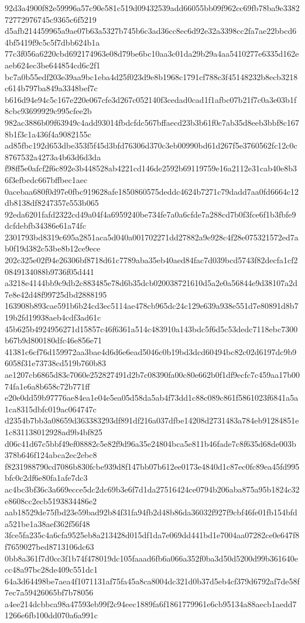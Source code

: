 {92d3a4900f82e59996a57c90e581c519d09432539add66055bb09f962cc69fb78ba9e338272772976745c9365c6f5219
d5afb214459965a9ae07b63a5327b745b6c3ad36cc8ec6d92e32a3398cc2fa7ae22bbcd64bf5419f9c5c5f7dbb624b1a
77c3f056a6220cbd692174963e08d79be6bc10aa3c01da29b29a4aa5410277e6335d162eaeb624ec3be644854cd6c2f1
bc7a0b55edf203e39aa9bc1eba4d25f023d9e8b1968c1791cf788c3f45148232b8ecb3218c614b797ba849a3348bef7c
b616d94e94c5c167e220e067cfe3d267c052140f3cedad0cad1f1afbc07b21f7c0a3e03b1f8cbc93699929c995cfee2b
982ac3886b09f63949c4add93014fbdcfdc567bffaecd23b3b61f0c7ab35d8eeb3bbf8c1678b1f3c1a436f4a9082155c
ad85fbc192d653dbe353f5f45d3bfd76306d370c3eb00990bd61d267f5e3760562fc12c0c8767532a4273a4b63d6d3da
f98ff5e0afcf2f6c892e3b448528ab4221cd146de2592b69119759e16a2112e31cab40e8b36f3efbedc667bffbec1aec
0acebaa680f0d97e0fbc919628afe1850860575deddc4624b7271c79dadd7aa0fd6664c12db8138df8247357e553b065
92eda6201fafd2322cd49a04f4a6959240be734fe7a0a6cfde7a288cd7b0f3fce6f1b3fbfe9dcfdebfb34386e61a74fc
2301793bd8319c695a2851aca5d040a001702271dd27882a9e928c4f28e075321572ed7ab0f19d382c53be8b12ce9ece
202c325e02f94e26306bf8718d61c7789aba35eb40aed84fac7d039bcd5743f82decfa1cf20849134088b9736f05d441
a3218e4144bb9c9db2c883485e78d6b35dcb020038721610d5a2e0a56844e9d38107a2d7e8e42d48f99725dbd2888195
163908b893cae591b6b24cd3ec5114ae478cb965dc24c129e639a938e551d7e80891d8b719b2fd19938aeb4cdf3ad61c
45b625b4924956271d15857c46f6361a514c483910a143bdc5f6d5c53dedc7118ebc7300b67b9d800180dfc46e856e71
41381c6cf76d159972aa3bae4d6d6e6ead5046c0b19bd3dcd60494bc82c02d6197dc9b96058f31e73738cd519b760b83
ae1207cb6865d83c7060e252827491d2b7c08390fa00c80e662b0f1df9ecfc7c459aa17b0074fa1e6a8b658c72b771ff
e20e0dd59b97776ae84ea1e04e5ea05d58da5ab4f73dd1c88c089c861f5861023f6841a5a1ca8315dbfc019ac064747c
d2354b7bb3a08659d363383293df891df216a037dfbe14208d2731483a784eb91284851e1c831138012928ad9b4bf825
d06c41d67c5bbf49ef08882c5e82f9d96a35e24804bca5e811b46fade7c8f635d68de003b378b646f124abca2ec2ebc8
f8231988790cd7086b830fcbe939d8f147bb07b612ee0173e4840d1c87ec0fc89ea45fd995bfc0c2df6e80fa1afe7dc3
ac4bc3bf36c3a669ecce5dc2dc69b3e6f7d1da27516424ce0794b206aba875a95b1824c32e8608cc2ecb5193834486e2
aab18529de75fbd23e59bad92b84f31fa94fb2d48b86da36032f927f9cbf46fe01fb154bfda521be1a38aef362f56f48
3fce5fa235c4a6cfa9525eb8a213428d015df1da7e069dd441bd1e7004aa07282ce0e647f8f7659027bed8713106dc63
0bb8a361f7d0cc3f1b74f478019dc105faaad6fb6a066a352f0ba3d50d5200d99b361640ecc48a97bc28de409c551dc1
64a3d64498be7aea4f1071131af75fa45a8ca8004dc321d0b37d5eb4cf379d6792af7de58f7ec7a59426065bf7b78056
a4ee214dcbbca98a47593eb99f2c94eec1889fa6f1861779961e6cb95134a88aecb1aedd71266e6fb100dd070a6a991c
}
